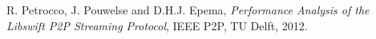\documentclass[pdftex, 12pt, a4paper]{report}
\begin{document}
\pagestyle{fancy}
\fancyhead{}
\fancyhead[LE, LO] {\today}



\tableofcontents

\pagebreak

\pagebreak
\begin{thebibliography}{9}

   R. Petrocco, J. Pouwelse and D.H.J. Epema,
  \emph{Performance Analysis of the Libswift P2P Streaming Protocol},
  IEEE P2P, TU Delft,
  2012.
\end{thebibliography}
\end{document}
